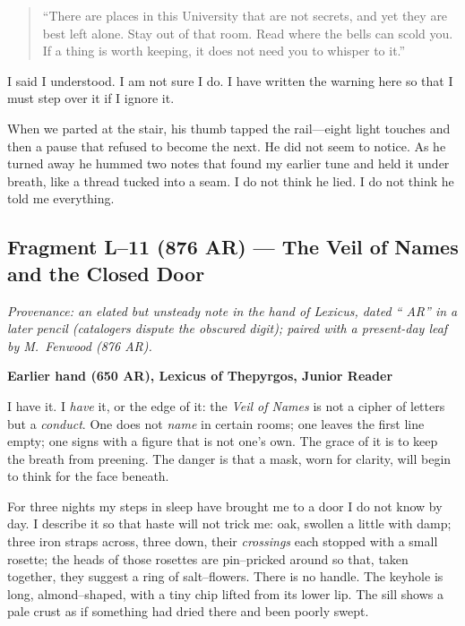 \documentclass[11pt]{article}
\begin{document}
\begin{quote}\small
“There are places in this University that are not secrets, and yet they are best left alone. Stay out of that room. Read where the bells can scold you. If a thing is worth keeping, it does not need you to whisper to it.”
\end{quote}

I said I understood. I am not sure I do. I have written the warning here so that I must step over it if I ignore it.

When we parted at the stair, his thumb tapped the rail—eight light touches and then a pause that refused to become the next. He did not seem to notice. As he turned away he hummed two notes that found my earlier tune and held it under breath, like a thread tucked into a seam. I do not think he lied. I do not think he told me everything.

\subsection{Fragment L--11 (876 AR)  — The Veil of Names and the Closed Door}
\label{frag:l11}

\noindent\textit{Provenance: an elated but unsteady note in the hand of Lexicus, dated “ AR” in a later pencil (catalogers dispute the obscured digit); paired with a present-day leaf by M.\ Fenwood (876 AR).}

\medskip
\noindent\textbf{Earlier hand (650 AR), Lexicus of Thepyrgos, Junior Reader}

I have it. I \emph{have} it, or the edge of it: the \textit{Veil of Names} is not a cipher of letters but a \emph{conduct}. One does not \emph{name} in certain rooms; one leaves the first line empty; one signs with a figure that is not one’s own. The grace of it is to keep the breath from preening. The danger is that a mask, worn for clarity, will begin to think for the face beneath.

For three nights my steps in sleep have brought me to a door I do not know by day. I describe it so that haste will not trick me: oak, swollen a little with damp; three iron straps across, three down, their \emph{crossings} each stopped with a small rosette; the heads of those rosettes are pin–pricked around so that, taken together, they suggest a ring of salt–flowers. There is no handle. The keyhole is long, almond–shaped, with a tiny chip lifted from its lower lip. The sill shows a pale crust as if something had dried there and been poorly swept.
\end{document}
